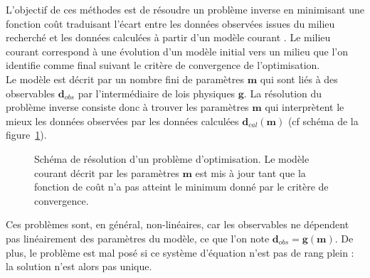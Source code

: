 L'objectif de ces méthodes est de résoudre un problème inverse en minimisant une fonction coût traduisant l'écart entre les données observées issues du milieu recherché et les données calculées à partir d'un modèle courant \citep{tarantola_book}. Le milieu courant correspond à une évolution d'un modèle initial vers un milieu que l'on identifie comme final suivant le critère de convergence de l'optimisation.\\


Le modèle est décrit par un nombre fini de paramètres $\bm{m}$ qui sont liés à des observables $\bm{d}_{obs}$ par l'intermédiaire de lois physiques $\bm{g}$. La résolution du problème inverse consiste donc à trouver les paramètres $\bm{m}$ qui interprètent le mieux les données observées par les données calculées $\bm{d}_{cal}(\bm{m})$ (cf schéma de la figure~\ref{pb_inv}). 

\begin{figure}[!h]
	\centering
	\caption{\label{pb_inv} Schéma de résolution d'un problème d'optimisation. Le modèle courant décrit par les paramètres $\bm{m}$ est mis à jour tant que la fonction de coût n'a pas atteint le minimum donné par le critère de convergence.}
\end{figure}

Ces problèmes sont, en général, non-linéaires, car les observables ne dépendent pas linéairement des paramètres du modèle, ce que l'on note $\bm{d}_{obs}=\bm{g}(\bm{m})$. De plus, le problème est mal posé si ce système d'équation n'est pas de rang plein : la solution n'est alors pas unique.

